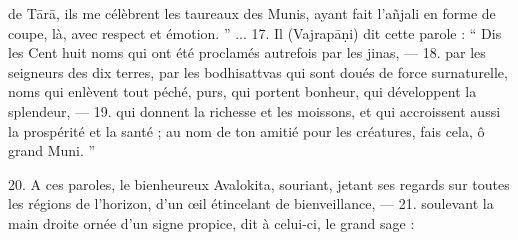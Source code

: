 \documentclass[a4paper, 11pt, oneside, french]{article}
\begin{document}
de T\={a}r\={a}, ils me célèbrent les taureaux des Munis, ayant fait l'a\~{n}jali en forme de coupe, là, avec respect et émotion. '' ... 17. Il (Vajrap\={a}\d{n}i) dit cette parole : `` Dis les Cent huit noms qui ont été proclamés autrefois par les jinas, --- 18. par les seigneurs des dix terres, par les bodhisattvas qui sont doués de force surnaturelle, noms qui enlèvent tout péché, purs, qui portent bonheur, qui développent la splendeur, --- 19. qui donnent la richesse et les moissons, et qui accroissent aussi la prospérité et la santé ; au nom de ton amitié pour les créatures, fais cela, ô grand Muni. ''

20. A ces paroles, le bienheureux Avalokita, souriant, jetant ses regards sur toutes les régions de l'horizon, d'un œil étincelant de bienveillance, --- 21. soulevant la main droite ornée d'un signe propice, dit à celui-ci, le grand sage :
\end{document}
